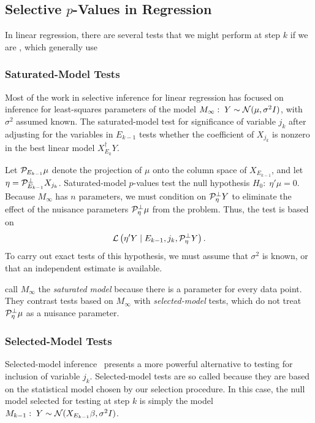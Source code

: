 \documentclass{article}
\begin{document}
\subsection{Selective $p$-Values in Regression}

In linear regression, there are several tests that we might perform at step $k$ if we are , which generally use 

\subsubsection{Saturated-Model Tests}
Most of the work in selective inference for linear regression has focused on inference for least-squares parameters of the model $M_\infty:\; Y \sim \mathcal{N}(\mu, \sigma^2I)$, with $\sigma^2$ assumed known. The saturated-model test for significance of variable $j_k$ after adjusting for the variables in $E_{k-1}$ tests whether the coefficient of $X_{j_k}$ is nonzero in the best linear model $X_{E_k}^\dagger Y$. 

Let $\mathcal{P}_{E_{k-1}}\mu$ denote the projection of $\mu$ onto the column space of $X_{E_{k-1}}$, and let $\eta = \mathcal{P}_{E_{k-1}}^\perp X_{j_k}$. Saturated-model $p$-values test the null hypothesis $H_0:\;\eta'\mu = 0$. Because $M_\infty$ has $n$ parameters, we must  condition on $\mathcal{P}_\eta^\perp Y$ to eliminate the effect of the nuisance parameters $\mathcal{P}_\eta^\perp \mu$ from the problem. Thus, the test is based on
\begin{equation}\label{eq:satModel}
\mathcal{L}\left( \eta'Y \mid E_{k-1}, j_k, \mathcal{P}_\eta^\perp Y \right).
\end{equation}
To carry out exact tests of this hypothesis, we must assume that $\sigma^2$ is known, or that an independent estimate is available.

 \citet{fithian2014optimal} call $M_\infty$ the {\em saturated model} because there is a parameter for every data point. They contrast tests based on $M_\infty$ with {\em selected-model} tests, which do not treat $\mathcal{P}_\eta^\perp \mu$ as a nuisance parameter. 


\subsubsection{Selected-Model Tests}
Selected-model inference~\citep{fithian2014optimal} presents a more powerful alternative to testing for inclusion of variable $j_k$. Selected-model tests are so called because they are based on the statistical model chosen by our selection procedure. In this case, the null model selected for testing at step $k$ is simply the model $M_{k-1}:\; Y \sim \mathcal{N}(X_{E_{k-1}}\beta, \sigma^2 I)$.
\end{document}
